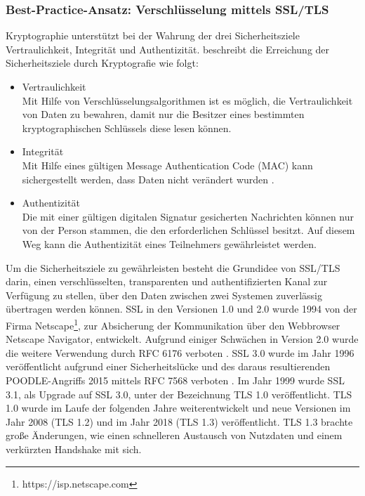 \subsubsection{Best-Practice-Ansatz: Verschlüsselung mittels SSL/TLS}
Kryptographie unterstützt bei der Wahrung der drei Sicherheitsziele \glqq{}Vertraulichkeit\grqq{}, \glqq{}Integrität\grqq{} und \glqq{}Authentizität\grqq{}. \textcite{SchwenkJörg2020SuKi} beschreibt die Erreichung der Sicherheitsziele durch Kryptografie wie folgt:
\begin{itemize}
    \item Vertraulichkeit\\
    Mit Hilfe von Verschlüsselungsalgorithmen ist es möglich, die Vertraulichkeit von Daten zu bewahren, damit nur die Besitzer eines bestimmten kryptographischen Schlüssels diese lesen können.
    \item Integrität\\
    Mit Hilfe eines gültigen \glqq{}Message Authentication Code\grqq{} (MAC) kann sichergestellt werden, dass Daten nicht verändert wurden \autocite{datatracker}. 
    \item Authentizität\\
    Die mit einer gültigen digitalen Signatur gesicherten Nachrichten können nur von der Person stammen, die den erforderlichen Schlüssel besitzt. Auf diesem Weg kann die Authentizität eines Teilnehmers gewährleistet werden. 
\end{itemize}
\bigbreak
Um die Sicherheitsziele zu gewährleisten besteht die Grundidee von SSL/TLS darin, einen verschlüsselten, transparenten und authentifizierten Kanal zur Verfügung zu stellen, über den Daten zwischen zwei Systemen zuverlässig übertragen werden können. 
\bigbreak
SSL in den Versionen 1.0 und 2.0 wurde 1994 von der Firma \glqq{}Netscape\footnote{https://isp.netscape.com}\grqq{}, zur Absicherung der Kommunikation über den Webbrowser \glqq{}Netscape Navigator\grqq{}, entwickelt. Aufgrund einiger Schwächen in Version 2.0 wurde die weitere Verwendung durch \glqq{}RFC 6176\grqq{} verboten \autocite{RFC6176}. SSL 3.0 wurde im Jahr 1996 veröffentlicht aufgrund einer Sicherheitslücke und des daraus resultierenden \glqq{}POODLE-Angriffs\grqq{} 2015 mittels \glqq{}RFC 7568\grqq{} verboten \autocite{RFC7568} \autocite{TA14-290A}. Im Jahr 1999 wurde SSL 3.1, als Upgrade auf SSL 3.0, unter der Bezeichnung TLS 1.0 veröffentlicht. TLS 1.0 wurde im Laufe der folgenden Jahre weiterentwickelt und neue Versionen im Jahr 2008 (TLS 1.2) und im Jahr 2018 (TLS 1.3) veröffentlicht. TLS 1.3 brachte große Änderungen, wie einen schnelleren Austausch von Nutzdaten und einem verkürzten Handshake mit sich. \autocite{SchwenkJörg2020SuKi}
